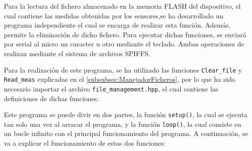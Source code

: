 Para la lectura del fichero almacenado en la memoria FLASH del dispositivo, el cual contiene las medidas obtenidas por los sensores,se ha desarrollado un programa independiente el cual se encarga de realizar esta función. Además, permite la eliminación de dicho fichero. Para ejecutar dichas funciones, se enviará por serial al micro un caracter u otro mediante el teclado. Ambas operaciones de realizan mediante el sistema de archivos SPIFFS.


Para la realización de este programa, se ha utilizado las funciones \texttt{Clear\_file} y \texttt{Read\_meas} explicadas en el \autoref{subsubsec:ManejadorFicheros}, por lo que ha sido necesario importar el archivo \texttt{file\_management.hpp}, el cual contiene las definiciones de dichas funciones.

Este programa se puede divir en dos partes, la función \texttt{setup()}, la cual se ejecuta tan solo una vez al arracar el programa, y la función \texttt{loop()}, la cual consiste en un bucle infinito con el principal funcionamiento del programa. A continuación, se va a explicar el funcionamiento de estas dos funciones:

